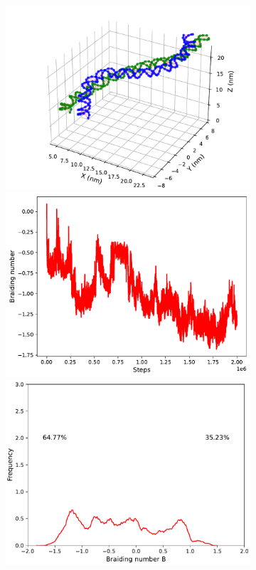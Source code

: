 \documentclass[a4paper,10pt]{article}
\begin{document}
\begin{figure}[tb]
\centering
\begin{subfigure}{.3\textwidth}
\vspace{1.13cm}
\includegraphics[width=\textwidth]{brF_0_2000000.pdf}
\includegraphics[width=\textwidth]{brF_0_braid.pdf}
\includegraphics[width=\textwidth]{brF_0_br_pr.pdf}

\end{subfigure}
\end{figure}
\end{document}
